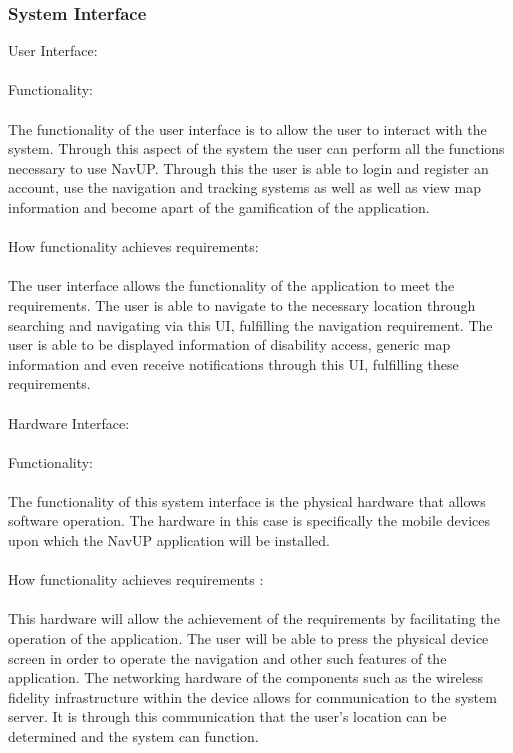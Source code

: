 \documentclass{article}
\begin{document}
        	\subsubsection{System Interface}{
User Interface:\\\\
Functionality:\\\\
The functionality of the user interface is to allow the user to interact with the system. Through this aspect of the system the user can perform all the functions necessary to use NavUP. Through this the user is able to login and register an account, use the navigation and tracking systems as well as well as view map information and become apart of the gamification of the application.\\\\
How functionality achieves requirements:\\\\
The user interface allows the functionality of the application to meet the requirements. The user is able to navigate to the necessary location through searching and navigating via this UI, fulfilling the navigation requirement. The user is able to be displayed information of disability access, generic map information and even receive notifications through this UI, fulfilling these requirements.\\\\
Hardware Interface:\\\\
Functionality:\\\\
The functionality of this system interface is the physical hardware that allows software operation. The hardware in this case is specifically the mobile devices upon which the NavUP application will be installed.\\\\
How functionality achieves requirements :\\\\
This hardware will allow the achievement of the requirements by facilitating the operation of the application. The user will be able to press the physical device screen in order to operate the navigation and other such features of the application. The networking hardware of the components such as the wireless fidelity infrastructure within the device allows for communication to the system server. It is through this communication that the user's location can be determined and the system can function.\\\\
}
\end{document}
